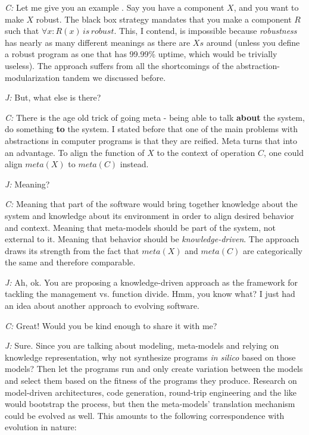 \documentclass[10pt]{sigplanconf}
\begin{document}
\emph{C:} Let me give you an example . Say you have a component $X$, and you want to make $X$ robust. The black box strategy mandates that you make a component $R$ such that  $\forall x:R(x)\,is\,robust$. This, I contend, is impossible because \emph{robustness} has nearly as many different meanings as there are $Xs$ around (unless you define a robust program as one that has 99.99\% uptime, which would be trivially useless). The approach suffers from all the shortcomings of the abstraction-modularization tandem we discussed before.

\emph{J:} But, what else is there?

\emph{C:} There is the age old trick of going meta - being able to talk \textbf{about} the system, do something \textbf{to} the system. I stated before that one of the main problems with abstractions in computer programs is that they are reified. Meta turns that into an advantage. To align the function of $X$ to the context of operation $C$, one could align $meta(X)$ to $meta(C)$ instead.

\emph{J:} Meaning?

\emph{C:} Meaning that part of the software would bring together knowledge about the system and knowledge about its environment in order to align desired behavior and context. Meaning that meta-models should be part of the system, not external to it. Meaning that behavior should be \emph{knowledge-driven}. The approach draws its strength from the fact that $meta(X)$ and $meta(C)$ are categorically the same and therefore comparable. 

\emph{J:} Ah, ok. You are proposing a knowledge-driven approach as the framework for tackling the management vs. function divide. Hmm, you know what? I just had an idea about another approach to evolving software.

\emph{C:} Great! Would you be kind enough to share it with me?

\emph{J:} Sure. Since you are talking about modeling, meta-models and relying on knowledge representation, why not synthesize programs \emph{in silico} based on those models? Then let the programs run and only create variation between the models and select them based on the fitness of the programs they produce. Research on model-driven architectures, code generation, round-trip engineering and the like would bootstrap the process, but then the meta-models' translation mechanism could be evolved as well. This amounts to the following correspondence with evolution in nature:
\end{document}
